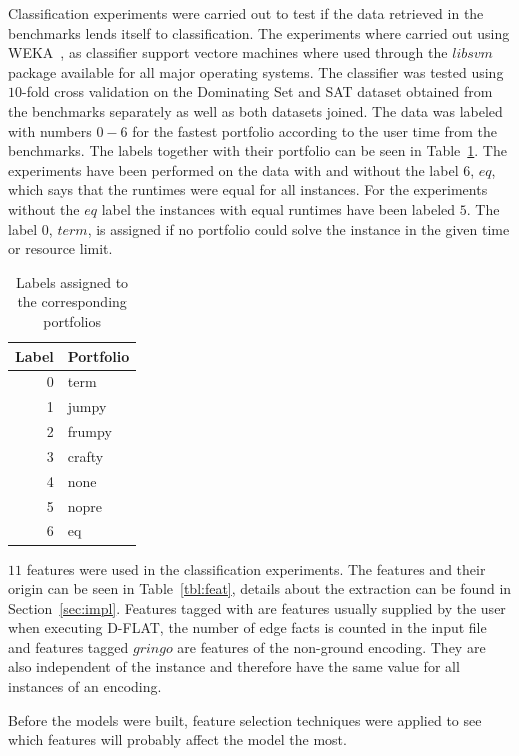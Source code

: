 Classification experiments were carried out to test if the data retrieved in the benchmarks lends itself to classification. The experiments where carried out using WEKA~\cite{WEKA}, as classifier support vectore machines where used through the \inline$libsvm$ package available for all major operating systems. The classifier was tested using $10$-fold cross validation on the {Dominating Set} and {SAT} dataset obtained from the benchmarks separately as well as both datasets joined. The data was labeled with numbers $0-6$ for the fastest portfolio according to the {user} time from the benchmarks.
The labels together with their portfolio can be seen in Table~\ref{tbl:mlLabel}. The experiments have been performed on the data with and without the label $6$, \inline$eq$, which says that the runtimes were equal for all instances. For the experiments without the \inline$eq$ label the instances with equal runtimes have been labeled $5$. The label $0$, \inline$term$, is assigned if no portfolio could solve the instance in the given time or resource limit.  
\begin{table}[h]
	\center
	\begin{tabular}{|r|l|}
		\hline
		Label & Portfolio\\
		\hline
		0 & term\\
		1 & jumpy\\
		2 & frumpy\\
		3 & crafty\\
		4 & none \\
		5 & nopre\\
		6 & eq\\
		\hline
	\end{tabular}
	\caption{Labels assigned to the corresponding portfolios}
	\label{tbl:mlLabel}
\end{table}


\par $11$ features were used in the classification experiments. The features and their origin can be seen in Table~\ref{tbl:feat}, details about the extraction can be found in Section~\ref{sec:impl}. Features tagged with  are features usually supplied by the user when executing \mbox{D-FLAT}, the number of edge facts is counted in the input file and features tagged \inline$gringo$ are features of the non-ground encoding. They are also independent of the instance and therefore have the same value for all instances of an encoding. 

Before the models were built, feature selection techniques were applied to see which features will probably affect the model the most.

